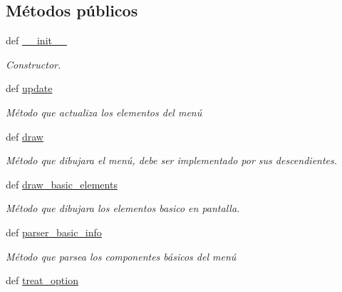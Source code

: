 \subsection*{\-Métodos públicos}
\begin{DoxyCompactItemize}
\item 
def \hyperlink{classengine_1_1basicmenu_1_1BasicMenu_a05a00539132bce6476cdb33980decca3}{\-\_\-\-\_\-init\-\_\-\-\_\-}
\begin{DoxyCompactList}\small\item\em \-Constructor. \end{DoxyCompactList}\item 
\hypertarget{classengine_1_1basicmenu_1_1BasicMenu_acf0d3dae92e2c935ed2a90a736c2bf2a}{
def \hyperlink{classengine_1_1basicmenu_1_1BasicMenu_acf0d3dae92e2c935ed2a90a736c2bf2a}{update}}
\label{classengine_1_1basicmenu_1_1BasicMenu_acf0d3dae92e2c935ed2a90a736c2bf2a}

\begin{DoxyCompactList}\small\item\em \-Método que actualiza los elementos del menú \end{DoxyCompactList}\item 
\hypertarget{classengine_1_1basicmenu_1_1BasicMenu_a9aa29d8e353d2d3329597f5fbbf125b3}{
def \hyperlink{classengine_1_1basicmenu_1_1BasicMenu_a9aa29d8e353d2d3329597f5fbbf125b3}{draw}}
\label{classengine_1_1basicmenu_1_1BasicMenu_a9aa29d8e353d2d3329597f5fbbf125b3}

\begin{DoxyCompactList}\small\item\em \-Método que dibujara el menú, debe ser implementado por sus descendientes. \end{DoxyCompactList}\item 
def \hyperlink{classengine_1_1basicmenu_1_1BasicMenu_a648895e2e3357d86770678d03e40a307}{draw\-\_\-basic\-\_\-elements}
\begin{DoxyCompactList}\small\item\em \-Método que dibujara los elementos basico en pantalla. \end{DoxyCompactList}\item 
def \hyperlink{classengine_1_1basicmenu_1_1BasicMenu_a86bb2a2f9457a1a2ec4b0102b547aa3e}{parser\-\_\-basic\-\_\-info}
\begin{DoxyCompactList}\small\item\em \-Método que parsea los componentes básicos del menú \end{DoxyCompactList}\item 
\hypertarget{classengine_1_1basicmenu_1_1BasicMenu_aeba02f53756b48c26d23782f0a0eab86}{
def \hyperlink{classengine_1_1basicmenu_1_1BasicMenu_aeba02f53756b48c26d23782f0a0eab86}{treat\-\_\-option}}
\label{classengine_1_1basicmenu_1_1BasicMenu_aeba02f53756b48c26d23782f0a0eab86}


\end{DoxyCompactItemize}
